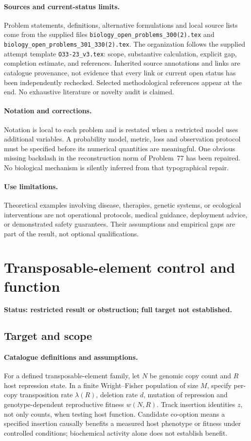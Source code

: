 \documentclass[11pt]{article}
\begin{document}
\paragraph{Sources and current-status limits.}
Problem statements, definitions, alternative formulations and local source lists
come from the supplied files
\texttt{biology\_open\_problems\_300(2).tex} and
\texttt{biology\_open\_problems\_301\_330(2).tex}.
The organization follows the supplied attempt template
\texttt{O33-23\_v3.tex}: scope, substantive calculation, explicit gap,
completion estimate, and references. Inherited source annotations and links are
catalogue provenance, not evidence that every link or current open status has
been independently rechecked. Selected methodological references appear at the
end. No exhaustive literature or novelty audit is claimed.

\paragraph{Notation and corrections.}
Notation is local to each problem and is restated when a restricted model uses
additional variables. A probability model, metric, loss and observation protocol
must be specified before its numerical quantities are meaningful. One obvious
missing backslash in the reconstruction norm of Problem~77 has been repaired.
No biological mechanism is silently inferred from that typographical repair.

\paragraph{Use limitations.}
Theoretical examples involving disease, therapies, genetic systems, or ecological
interventions are not operational protocols, medical guidance, deployment advice,
or demonstrated safety guarantees. Their assumptions and empirical gaps are part
of the result, not optional qualifications.


\section*{Transposable-element control and function}
\label{prob:038}
\noindent\textbf{Status: restricted result or obstruction; full target not established.}
\subsection{Target and scope}
\paragraph{Catalogue definitions and assumptions.}
For a defined transposable-element family, let $N$ be genomic copy count and $R$ host repression state. In a finite Wright--Fisher population of size $M$, specify per-copy transposition rate $\lambda(R)$, deletion rate $d$, mutation of repression and genotype-dependent reproductive fitness $w(N,R)$. Track insertion identities $z$, not only counts, when testing host function. Candidate co-option means a specified insertion causally benefits a measured host phenotype or fitness under controlled conditions; biochemical activity alone does not establish benefit.
\end{document}
